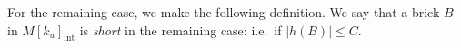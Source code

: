 \documentclass{amsart}
\theoremstyle{definition}
\numberwithin{figure}{section}
\numberwithin{equation}{section}
\newcommand{\ie}{i.e.\ }
\newcommand{\Fr}{\mathrm{Fr}}
\def\cv{\mathcal{V}}
\begin{document}
For the remaining case, we make the following definition.
We say that a brick $B$ in $M[k_u]_\mathrm{int}$ is {\em short} in the remaining case: \ie if 
$|h(B)| \leq C$.


\end{document}
